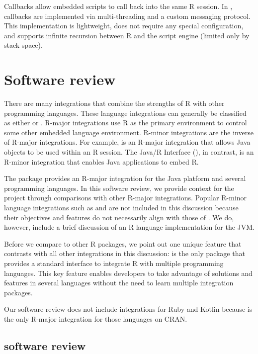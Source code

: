Callbacks allow embedded scripts to call back into the same R session. In , callbacks are implemented via multi-threading and a custom messaging protocol. This implementation is lightweight, does not require any special configuration, and supports infinite recursion between R and the script engine (limited only by stack space).

\hypertarget{software-review}{}
\section{Software review}

There are many integrations that combine the strengths of R with other programming languages. These language integrations can generally be classified as either  or . R-major integrations use R as the primary environment to control some other embedded language environment. R-minor integrations are the inverse of R-major integrations. For example,  is an R-major integration that allows Java objects to be used within an R session. The Java/R Interface (), in contrast, is an R-minor integration that enables Java applications to embed R.

The  package provides an R-major integration for the Java platform and several programming languages. In this software review, we provide context for the  project through comparisons with other R-major integrations. Popular R-minor language integrations such as  \citep{rserve} and  \citep{opencpu} are not included in this discussion because their objectives and features do not necessarily align with those of . We do, however, include a brief discussion of an R language implementation for the JVM.

Before we compare  to other R packages, we point out one unique feature that contrasts  with all other integrations in this discussion:  is the only package that provides a standard interface to integrate R with multiple programming languages. This key feature enables developers to take advantage of solutions and features in several languages without the need to learn multiple integration packages.

Our software review does not include integrations for Ruby and Kotlin because  is the only R-major integration for those languages on CRAN.

\hypertarget{rjava-software-review}{}
\subsection{ software review}

